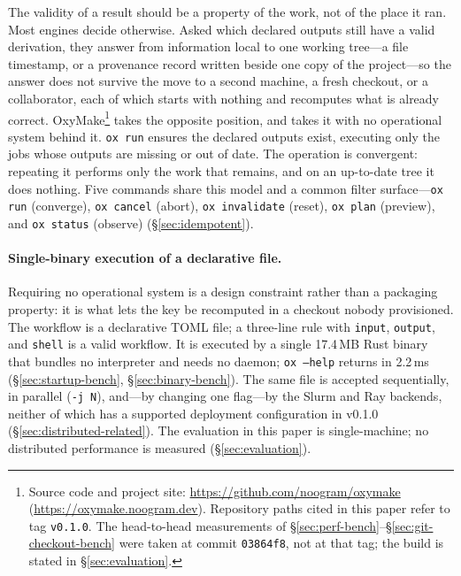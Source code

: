 \documentclass[12pt,a4paper]{article}
\newcommand{\code}[1]{{\texttt{\small\color{inlinecode}#1}}}
\begin{document}
The validity of a result should be a property of the work, not of the
place it ran. Most engines decide otherwise. Asked which declared
outputs still have a valid derivation, they answer from information
local to one working tree---a file timestamp, or a provenance record
written beside one copy of the project---so the answer does not survive
the move to a second machine, a fresh checkout, or a collaborator, each
of which starts with nothing and recomputes what is already correct.
OxyMake\footnote{Source code and project site:
\url{https://github.com/noogram/oxymake}
(\url{https://oxymake.noogram.dev}). Repository paths cited in this
paper refer to tag \code{v0.1.0}. The head-to-head measurements of
\S\ref{sec:perf-bench}--\S\ref{sec:git-checkout-bench} were taken at
commit \code{03864f8}, not at that tag; the build is stated in
\S\ref{sec:evaluation}.}
takes the opposite position, and takes it with no operational system
behind it. \code{ox run} ensures the declared
outputs exist, executing
only the jobs whose outputs are missing or out of date. The operation is
convergent: repeating it performs only the work that remains, and on an
up-to-date tree it does nothing. Five commands share this model and a
common filter surface---\code{ox run} (converge), \code{ox cancel}
(abort), \code{ox invalidate} (reset), \code{ox plan} (preview), and
\code{ox status} (observe) (\S\ref{sec:idempotent}).

\paragraph{Single-binary execution of a declarative file.}
Requiring no operational system is a design constraint rather than a
packaging property: it is what lets the key be recomputed in a checkout
nobody provisioned.
The workflow is a declarative TOML file; a three-line rule with
\code{input}, \code{output}, and \code{shell} is a valid workflow. It is
executed by a single 17.4\,MB Rust binary that bundles no interpreter
and needs no daemon; \code{ox --help} returns in 2.2\,ms
(\S\ref{sec:startup-bench}, \S\ref{sec:binary-bench}). The same file is
accepted sequentially, in parallel (\code{-j N}), and---by changing one
flag---by the Slurm and Ray backends, neither of which has a supported
deployment configuration in v0.1.0 (\S\ref{sec:distributed-related}).
The evaluation in this paper is single-machine; no distributed
performance is measured (\S\ref{sec:evaluation}).
\end{document}
